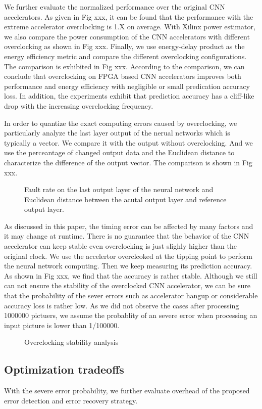 We further evaluate the normalized performance over the original CNN accelerators.
As given in Fig xxx, it can be found that the performance with the extreme accelerator 
overclocking is 1.X on average. With Xilinx power estimator, we also compare the 
power consumption of the CNN accelerators with different overclocking as shown in Fig xxx.
Finally, we use energy-delay product as the energy efficiency metric and compare the 
different overclocking configurations. The comparison is exhibited in Fig xxx.
According to the comparison, we can conclude that overclocking on FPGA based CNN 
accelerators improves both performance and energy efficiency with negligible or small 
predication accuracy loss. In addition, the experiments exhibit that prediction 
accuracy has a cliff-like drop with the increasing overclocking frequency. 

In order to quantize the exact computing errors caused by overclocking, we 
particularly analyze the last layer output of the nerual networks which 
is typically a vector. We compare it with the output without overclocking.
And we use the perceantage of changed output data and the Euclidean distance to 
characterize the difference of the output vector. The comparison is shown in Fig xxx.

\begin{figure}
    \caption{Fault rate on the last output layer of the neural network and Euclidean distance between the acutal output layer and reference output layer.}
\label{fig:fault_rate}
\vspace{-1em}
\end{figure}


As discussed in this paper, the timing error can be affected by many factors and it may change 
at runtime. There is no guarantee that the behavior of the CNN accelerator can keep stable even 
overclocking is just slighly higher than the original clock. We use the accelertor overclcoked at the 
tipping point to perform the neural network computing. Then we keep measuring its 
prediction accuracy. As shown in Fig xxx, we find that the accuracy is rather stable.
Although we still can not ensure the stability of the overclocked CNN accelerator, we can 
be sure that the probability of the sever errors such as accelerator hangup or considerable 
accuracy loss is rather low. As we did not observe the cases after processing 1000000 pictuers, 
we assume the probablity of an severe error when processing an input picture is lower than 1/100000.
\begin{figure}
    \caption{Overclocking stability analysis}
\label{fig:stability}
\vspace{-1em}
\end{figure}


\subsection{Optimization tradeoffs}
With the severe error probability, we further evaluate overhead of 
the proposed error detection and error recovery strategy.

